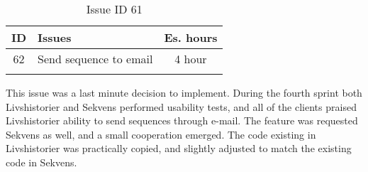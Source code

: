 \begin{longtable} { | c | p{12cm} | c | } 
\hline
	ID 	&	Issues	&		 Es. hours \\\hline
	62	&	Send sequence to email	&	4 hour	\\\hline
\caption{Issue ID 61}
\label{tab:spr4_sequenceemail}
\end{longtable}
 
This issue was a last minute decision to implement. During the fourth sprint both Livshistorier and Sekvens performed usability tests, and all of the clients praised Livshistorier ability to send sequences through e-mail. The feature was requested Sekvens as well, and a small cooperation emerged. The code existing in Livshistorier was practically copied, and slightly adjusted to match the existing code in Sekvens. 
